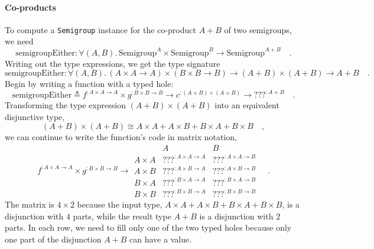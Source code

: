 \paragraph{Co-products}

To compute a \lstinline!Semigroup! instance for the co-product $A+B$
of two semigroups, we need
\[
\text{semigroupEither}:\forall(A,B).\,\text{Semigroup}^{A}\times\text{Semigroup}^{B}\rightarrow\text{Semigroup}^{A+B}\quad.
\]
Writing out the type expressions, we get the type signature
\[
\text{semigroupEither}:\forall(A,B).\,\left(A\times A\rightarrow A\right)\times\left(B\times B\rightarrow B\right)\rightarrow\left(A+B\right)\times\left(A+B\right)\rightarrow A+B\quad.
\]
Begin by writing a function with a typed hole:
\[
\text{semigroupEither}\triangleq f^{:A\times A\rightarrow A}\times g^{:B\times B\rightarrow B}\rightarrow c^{:\left(A+B\right)\times\left(A+B\right)}\rightarrow\text{???}^{:A+B}\quad.
\]
Transforming the type expression $\left(A+B\right)\times\left(A+B\right)$
into an equivalent disjunctive type,
\[
\left(A+B\right)\times\left(A+B\right)\cong A\times A+A\times B+B\times A+B\times B\quad,
\]
we can continue to write the function's code in matrix notation,
\[
f^{:A\times A\rightarrow A}\times g^{:B\times B\rightarrow B}\rightarrow\begin{array}{|c||cc|}
 & A & B\\
\hline A\times A & \text{???}^{:A\times A\rightarrow A} & \text{???}^{:A\times A\rightarrow B}\\
A\times B & \text{???}^{:A\times B\rightarrow A} & \text{???}^{:A\times B\rightarrow B}\\
B\times A & \text{???}^{:B\times A\rightarrow A} & \text{???}^{:B\times A\rightarrow B}\\
B\times B & \text{???}^{:B\times B\rightarrow A} & \text{???}^{:B\times B\rightarrow B}
\end{array}\quad.
\]
The matrix is $4\times2$ because the input type, $A\times A+A\times B+B\times A+B\times B$,
is a disjunction with $4$ parts, while the result type $A+B$ is
a disjunction with $2$ parts. In each row, we need to fill only one
of the two typed holes because only one part of the disjunction $A+B$
can have a value.

